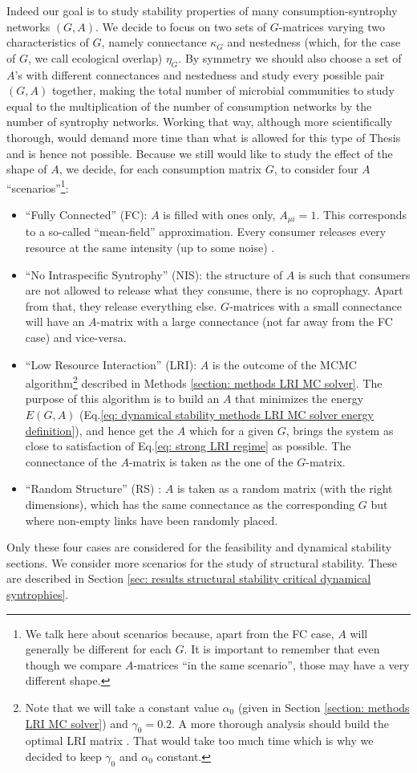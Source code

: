 \documentclass[12pt]{report}
\begin{document}
Indeed our goal is to study stability properties of many consumption-syntrophy networks $(G,A)$. We decide to focus on two sets of $G$-matrices varying two characteristics of $G$, namely connectance $\kappa_G$ and nestedness (which, for the case of $G$, we call ecological overlap) $\eta_G$. By symmetry we should also choose a set of $A$'s with different connectances and nestedness and study every possible pair $(G,A)$ together, making the total number of microbial communities to study equal to the multiplication of the number of consumption networks by the number of syntrophy networks. Working that way, although more scientifically thorough, would demand more time than what is allowed for this type of Thesis and is hence not possible. Because we still would like to study the effect of the shape of $A$, we decide, for each consumption matrix $G$, to consider four $A$ ``scenarios''\footnote{We talk here about scenarios because, apart from the FC case, $A$ will generally be different for each $G$. It is important to remember that even though we compare $A$-matrices ``in the same scenario'', those may have a very different shape.}:
\begin{itemize}
  \item ``Fully Connected'' (FC): $A$ is filled with ones only, $A_{\mu i}=1$. This corresponds to a so-called ``mean-field'' approximation. Every consumer releases every resource at the same intensity (up to some noise) .
  \item ``No Intraspecific Syntrophy'' (NIS): the structure of $A$ is such that consumers are not allowed to release what they consume, \ie there is no coprophagy. Apart from that, they release everything else. $G$-matrices with a small connectance will have an $A$-matrix with a large connectance (not far away from the FC case) and vice-versa.
  \item ``Low Resource Interaction'' (LRI): $A$ is the outcome of the MCMC algorithm\footnote{Note that we will take a constant value $\alpha_0$ (given in Section \ref{section: methods LRI MC solver}) and $\gamma_0=0.2$. A more thorough analysis should build the optimal LRI matrix . That would take too much time which is why we decided to keep $\gamma_0$ and $\alpha_0$ constant.}
 described in Methods \ref{section: methods LRI MC solver}. The purpose of this algorithm is to build an $A$ that minimizes the energy $E(G,A)$ (Eq.\ref{eq: dynamical stability methods LRI MC solver energy definition}), and hence get the $A$ which for a given $G$, brings the system as close to satisfaction of Eq.\eqref{eq: strong LRI regime} as possible. The connectance of the $A$-matrix is taken as the one of the $G$-matrix.
 \item ``Random Structure'' (RS) : $A$ is taken as a random matrix (with the right dimensions), which has the same connectance as the corresponding $G$ but where non-empty links have been randomly placed.
 \end{itemize}
Only these four cases are considered for the feasibility and dynamical stability sections. We consider more scenarios for the study of structural stability. These are described in Section \ref{sec: results structural stability critical dynamical syntrophies}.
\end{document}

